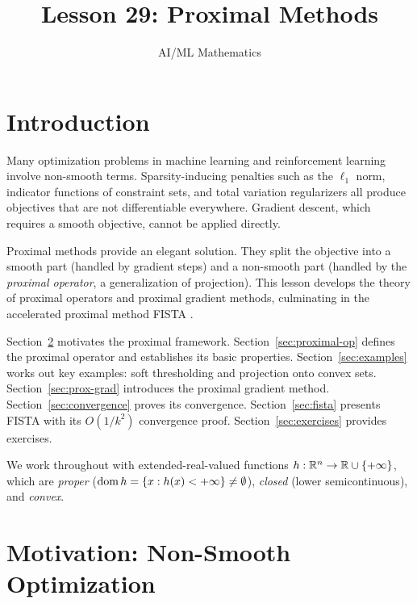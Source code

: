 \documentclass[11pt,a4paper]{article}
\title{Lesson 29: Proximal Methods}
\author{AI/ML Mathematics}
\date{}
\begin{document}
\maketitle
\tableofcontents
\newpage


\section{Introduction}\label{sec:intro}

Many optimization problems in machine learning and reinforcement learning
involve non-smooth terms. Sparsity-inducing penalties such as the
$\ell_1$ norm, indicator functions of constraint sets, and total
variation regularizers all produce objectives that are not
differentiable everywhere. Gradient descent, which requires a smooth
objective, cannot be applied directly.

Proximal methods provide an elegant solution. They split the objective
into a smooth part (handled by gradient steps) and a non-smooth part
(handled by the \emph{proximal operator}, a generalization of
projection). This lesson develops the theory of proximal operators and
proximal gradient methods, culminating in the accelerated proximal
method FISTA \citep{beck2009}.

Section~\ref{sec:motivation} motivates the proximal framework.
Section~\ref{sec:proximal-op} defines the proximal operator and
establishes its basic properties.
Section~\ref{sec:examples} works out key examples: soft thresholding
and projection onto convex sets.
Section~\ref{sec:prox-grad} introduces the proximal gradient method.
Section~\ref{sec:convergence} proves its convergence.
Section~\ref{sec:fista} presents FISTA with its $O(1/k^2)$
convergence proof.
Section~\ref{sec:exercises} provides exercises.

We work throughout with extended-real-valued functions
$h : \mathbb{R}^n \to \mathbb{R} \cup \{+\infty\}$, which are \emph{proper}
($\operatorname{dom} h = \{x : h(x) < +\infty\} \ne \emptyset$), \emph{closed}
(lower semicontinuous), and \emph{convex}.


\section{Motivation: Non-Smooth Optimization}\label{sec:motivation}
\end{document}
